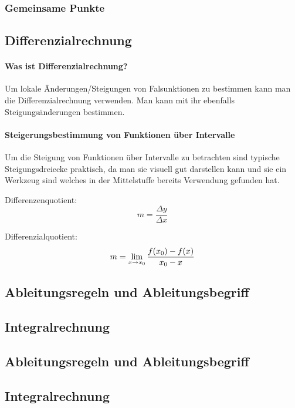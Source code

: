 \documentclass{article}
\begin{document}
	\subsubsection{Gemeinsame Punkte}

	\subsection{Differenzialrechnung}
		\paragraph{Was ist Differenzialrechnung?}
			Um lokale Änderungen/Steigungen von Falsunktionen zu bestimmen kann man die Differenzialrechnung verwenden.
			Man kann mit ihr ebenfalls Steigungsänderungen bestimmen.
			
		\paragraph{Steigerungsbestimmung von Funktionen über Intervalle}
	
			Um die Steigung von Funktionen über Intervalle zu betrachten sind typische Steigungsdreiecke praktisch,
			da man sie visuell gut darstellen kann und sie ein Werkzeug sind welches in der Mittelstuffe bereits
			Verwendung gefunden hat.
			
			Differenzenquotient:
			\[
			    m = {\frac {\Delta y} {\Delta x}}
			\]
			
			Differenzialquotient:
			\[
			    m = \lim_{x \to x_{0}} {{f(x_{0}) - f(x)} \over { x_{0} - x}}
			\]


	\subsection{Ableitungsregeln und Ableitungsbegriff}\label{Ableitungen}
	
	\subsection{Integralrechnung}\label{Integralrechnung}
	\subsection{Ableitungsregeln und Ableitungsbegriff}\label{Ableitungen}
	\subsection{Integralrechnung}\label{Integralrechnung}
\end{document}
